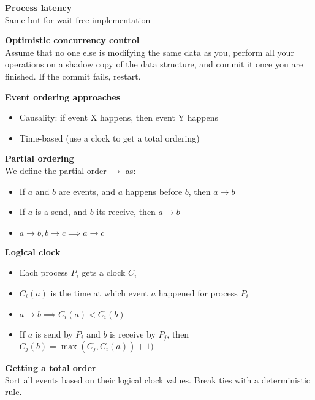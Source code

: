\documentclass[10pt,letterpaper,landscape]{report}
\newcommand{\boxheight}{21.59cm}
\newcommand{\boxwidth}{8.85cm}
\begin{document}
\begin{small}
{\begin{minipage}[t][\boxheight][c]{\boxwidth}
    \textbf{Process latency}\\
    Same but for wait-free implementation
    
    \textbf{Optimistic concurrency control}\\
    Assume that no one else is modifying the same data as you, perform all your operations on a shadow copy of the data structure, and commit it once you are finished. If the commit fails, restart.
    
    \textbf{Event ordering approaches}
    \begin{itemize}
        \item Causality: if event X happens, then event Y happens
        \item Time-based (use a clock to get a total ordering)
    \end{itemize}

    \textbf{Partial ordering}\\
    We define the partial order $\rightarrow$ as:
    \begin{itemize}
        \item If $a$ and $b$ are events, and $a$ happens before $b$, then $a\rightarrow b$
        \item If $a$ is a send, and $b$ its receive, then $a\rightarrow b$
        \item $a\rightarrow b, b\rightarrow c \implies a\rightarrow c$
    \end{itemize}
    
    \textbf{Logical clock}
    \begin{itemize}
        \item Each process $P_i$ gets a clock $C_i$
        \item $C_i(a)$ is the time at which event $a$ happened for process $P_i$
        \item $a\rightarrow b \implies C_i(a) < C_i(b)$
        \item If $a$ is send by $P_i$ and $b$ is receive by $P_j$, then\\ $C_j(b) = \max(C_j, C_i(a)) + 1)$
    \end{itemize}
    
    \textbf{Getting a total order}\\
    Sort all events based on their logical clock values. Break ties with a deterministic rule.

\end{minipage}
}\fbox{
\begin{minipage}[t][\boxheight][c]{\boxwidth}



\end{minipage}}
\end{small}
\end{document}
